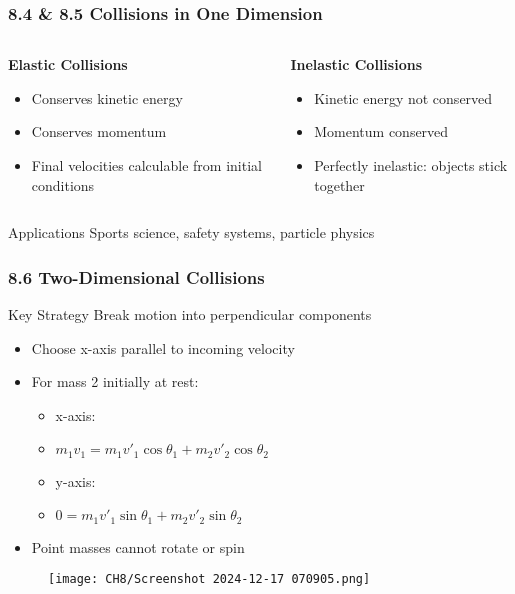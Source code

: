 \documentclass{beamer}
\begin{document}
\begin{frame}
\frametitle{8.4 & 8.5 Collisions in One Dimension}
\begin{columns}[t]
\begin{column}{0.48\textwidth}
\textbf{Elastic Collisions}
\begin{itemize}
\item Conserves kinetic energy
\item Conserves momentum
\item Final velocities calculable from initial conditions
\end{itemize}
\end{column}

\begin{column}{0.48\textwidth}
\textbf{Inelastic Collisions}
\begin{itemize}
\item Kinetic energy not conserved
\item Momentum conserved
\item Perfectly inelastic: objects stick together
\end{itemize}
\end{column}
\end{columns}

\begin{block}{Applications}
Sports science, safety systems, particle physics
\end{block}
\end{frame}

\begin{frame}
\frametitle{8.6 Two-Dimensional Collisions}

\begin{block}{Key Strategy}
Break motion into perpendicular components
\end{block}

\begin{itemize}
\item Choose x-axis parallel to incoming velocity
\item For mass 2 initially at rest:
    \begin{itemize}
    \item x-axis:
    \item $m_1v_1 = m_1v'_1\cos\theta_1 + m_2v'_2\cos\theta_2$
    \item y-axis:
    \item $0 = m_1v'_1\sin\theta_1 + m_2v'_2\sin\theta_2$
    \end{itemize}
\item Point masses cannot rotate or spin
\end{itemize}
\end{frame}
\begin{frame}{}
    \begin{figure}
        \centering
        \texttt{[image: CH8/Screenshot 2024-12-17 070905.png]}
       
    \end{figure}
\end{frame}
\end{document}
